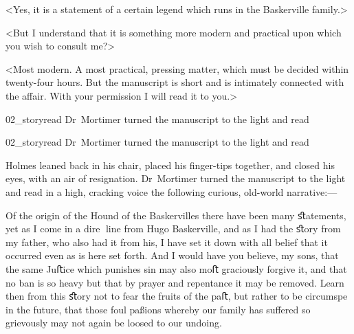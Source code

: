 <Yes, it is a statement of a certain legend which runs in the Baskerville family.>

<But I understand that it is something more modern and practical upon which you wish to consult me?>

<Most modern. A most practical, pressing matter, which must be decided within twenty-four hours. But the manuscript is short and is intimately connected with the affair. With your permission I will read it to you.>


\begin{withoutfootnotes}
	\begin{letter}
		\begin{bwbigpic}
				[1.0]  
			{02_storyread}
			{Dr~Mortimer turned the manuscript to the light and read}
		\end{bwbigpic}
	\end{letter}
	\begin{a4}
		\begin{bwbigpic}
				[1.0] 
			{02_storyread}
			{Dr~Mortimer turned the manuscript to the light and read}
		\end{bwbigpic}
	\end{a4}
\end{withoutfootnotes}

Holmes leaned back in his chair, placed his finger-tips together, and closed his eyes, with an air of resignation. Dr~Mortimer turned the manuscript to the light and read in a high, cracking voice the following curious, old-world narrative:— 

\divider


\oldfont
Of the origin of the Hound of the Baskervilles there have been many ﬆatements, yet as I come in a dire line from Hugo Baskerville, and as I had the ﬆory from my father, who also had it from his, I have set it down with all belief that it occurred even as is here set forth. And I would have you believe, my sons, that the same Juﬅice which punishes sin may also moﬅ graciously forgive it, and that no ban is so heavy but that by prayer and repentance it may be removed. Learn then from this ﬆory not to fear the fruits of the paﬅ, but rather to be circumspe in the future, that those foul paßions whereby our family has suﬀered so grievously may not again be loosed to our undoing.

